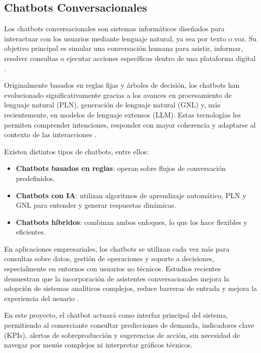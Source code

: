 \subsection{Chatbots Conversacionales}

Los chatbots conversacionales son sistemas informáticos diseñados para interactuar con los usuarios mediante lenguaje natural, ya sea por texto o voz. Su objetivo principal es simular una conversación humana para asistir, informar, resolver consultas o ejecutar acciones específicas dentro de una plataforma digital \parencite{radziwill2017}.

Originalmente basados en reglas fijas y árboles de decisión, los chatbots han evolucionado significativamente gracias a los avances en procesamiento de lenguaje natural (PLN), generación de lenguaje natural (GNL) y, más recientemente, en modelos de lenguaje extensos (LLM). Estas tecnologías les permiten comprender intenciones, responder con mayor coherencia y adaptarse al contexto de las interacciones \parencite{shum2018}.

Existen distintos tipos de chatbots, entre ellos:

\begin{itemize}
    \item \textbf{Chatbots basados en reglas}: operan sobre flujos de conversación predefinidos.
    
    \item \textbf{Chatbots con IA}: utilizan algoritmos de aprendizaje automático, PLN y GNL para entender y generar respuestas dinámicas.
    
    \item \textbf{Chatbots híbridos}: combinan ambos enfoques, lo que los hace flexibles y eficientes.
\end{itemize}

En aplicaciones empresariales, los chatbots se utilizan cada vez más para consultas sobre datos, gestión de operaciones y soporte a decisiones, especialmente en entornos con usuarios no técnicos. Estudios recientes demuestran que la incorporación de asistentes conversacionales mejora la adopción de sistemas analíticos complejos, reduce barreras de entrada y mejora la experiencia del usuario \parencite{knote2021}.

En este proyecto, el chatbot actuará como interfaz principal del sistema, permitiendo al comerciante consultar predicciones de demanda, indicadores clave (KPIs), alertas de sobreproducción y sugerencias de acción, sin necesidad de navegar por menús complejos ni interpretar gráficos técnicos.

